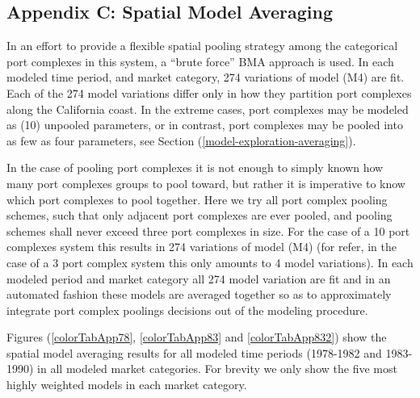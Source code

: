 \documentclass[12pt]{article}
\begin{document}
%
\clearpage
%

%
\subsection{Appendix C: Spatial Model Averaging}\label{appBMA}


In an effort to provide a flexible spatial pooling strategy among the 
categorical port complexes in this system, a ``brute force'' BMA approach 
is used. In each modeled time period, and market category, 274 variations of 
model (M4) are fit. Each of the 274 model variations differ only in how they 
partition port complexes along the California coast. In the extreme cases, 
port complexes may be modeled as (10) unpooled parameters, or in contrast, port 
complexes may be pooled into as few as four parameters, see Section (\ref{model-exploration-averaging}). 

In the case of pooling port complexes it is not enough to simply known how 
many port complexes groups to pool toward, but rather it is imperative to 
know which port complexes to pool together. Here we try all port complex 
pooling schemes, such that only adjacent port complexes are ever pooled, and
pooling schemes shall never exceed three port complexes in size. For the case 
of a 10 port complexes system this results in 274 variations of model (M4) 
(for refer, in the case of a 3 port complex system this only amounts to 4 
model variations).  In each modeled period and market category all 274 model 
variation are fit and in an automated fashion these models are averaged 
together so as to approximately integrate port complex poolings decisions out 
of the modeling procedure.  

Figures (\ref{colorTabApp78}, \ref{colorTabApp83} and \ref{colorTabApp832}) show the spatial model 
averaging results for all modeled time periods (1978-1982 and 1983-1990) in 
all modeled market categories. For brevity we only show the five most highly 
weighted models in each market category.
\end{document}

